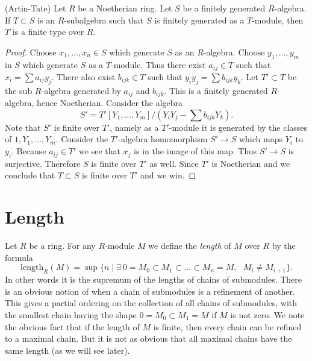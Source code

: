 \begin{lemma}
\label{lemma-Artin-Tate}
(Artin-Tate) Let $R$ be a Noetherian ring. Let $S$ be a finitely
generated $R$-algebra. If $T \subset S$ is an $R$-subalgebra such
that $S$ is finitely generated as a $T$-module, then $T$ is a
finite type over $R$.
\end{lemma}

\begin{proof}
Choose $x_1,\ldots,x_n \in S$ which generate $S$ as an $R$-algebra.
Choose $y_1,\ldots,y_m$ in $S$ which generate $S$ as a $T$-module.
Thus there exist $a_{ij} \in T$ such that
$x_i = \sum a_{ij} y_j$. There also exist $b_{ijk} \in T$ such
that $y_i y_j = \sum b_{ijk} y_k$. Let $T' \subset T$ be the
sub $R$-algebra generated by $a_{ij}$ and $b_{ijk}$. This is a finitely
generated $R$-algebra, hence Noetherian. Consider the algebra
$$
S' = T'[Y_1, \ldots, Y_m]/(Y_i Y_j - \sum b_{ijk} Y_k).
$$
Note that $S'$ is finite over $T'$, namely as a $T'$-module it is 
generated by the classes of $1, Y_1,\ldots, Y_m$.
Consider the $T'$-algebra homomorphism $S' \to S$ which maps
$Y_i$ to $y_i$. Because $a_{ij} \in T'$ we see that $x_j$ is
in the image of this map. Thus $S' \to S$ is surjective. 
Therefore $S$ is finite over $T'$ as well. Since $T'$ is Noetherian
and we conclude that $T \subset S$ is finite over $T'$ and
we win.
\end{proof}























\section{Length}
\label{section-length}

\noindent
Let $R$ be a ring. For any $R$-module $M$
we define the {\it length} of $M$ over $R$ by the
formula
$$
\text{length}_R(M)
=
\sup
\{
n
\mid
\exists\ 0=M_0 \subset M_1 \subset \ldots \subset M_n=M,
\text{ }M_i \not= M_{i+1}
\}.
$$
In other words it is the supremum of the lengths of chains 
of submodules. There is an obvious notion of when a chain
of submodules is a refinement of another. This gives a partial
ordering on the collection of all chains of submodules,
with the smallest chain having the shape $0 = M_0 \subset M_1 = M$
if $M$ is not zero.
We note the obvious fact that if the length of
$M$ is finite, then every chain can be refined to a
maximal chain. But it is not as obvious that all maximal
chains have the same length (as we will see later).

